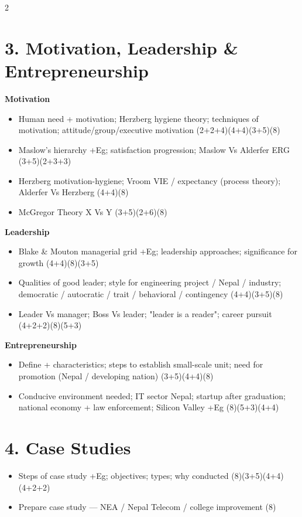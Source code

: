 \documentclass[10pt]{article}
\begin{document}
\begin{multicols}{2}
\section*{3. Motivation, Leadership \& Entrepreneurship}
\textbf{Motivation}
\begin{itemize}
  \item Human need + motivation; Herzberg hygiene theory; techniques of motivation; attitude/group/executive motivation \hfill (2+2+4)(4+4)(3+5)(8)
  \item Maslow's hierarchy +Eg; satisfaction progression; Maslow Vs Alderfer ERG \hfill (3+5)(2+3+3)
  \item Herzberg motivation-hygiene; Vroom VIE / expectancy (process theory); Alderfer Vs Herzberg \hfill (4+4)(8)
  \item McGregor Theory X Vs Y \hfill (3+5)(2+6)(8)
\end{itemize}
\textbf{Leadership}
\begin{itemize}
  \item Blake \& Mouton managerial grid +Eg; leadership approaches; significance for growth \hfill (4+4)(8)(3+5)
  \item Qualities of good leader; style for engineering project / Nepal / industry; democratic / autocratic / trait / behavioral / contingency \hfill (4+4)(3+5)(8)
  \item Leader Vs manager; Boss Vs leader; "leader is a reader"; career pursuit \hfill (4+2+2)(8)(5+3)
\end{itemize}
\textbf{Entrepreneurship}
\begin{itemize}
  \item Define + characteristics; steps to establish small-scale unit; need for promotion (Nepal / developing nation) \hfill (3+5)(4+4)(8)
  \item Conducive environment needed; IT sector Nepal; startup after graduation; national economy + law enforcement; Silicon Valley +Eg \hfill (8)(5+3)(4+4)
\end{itemize}

\section*{4. Case Studies}
\begin{itemize}
  \item Steps of case study +Eg; objectives; types; why conducted \hfill (8)(3+5)(4+4)(4+2+2)
  \item Prepare case study --- NEA / Nepal Telecom / college improvement \hfill (8)
\end{itemize}


\end{multicols}
\end{document}
